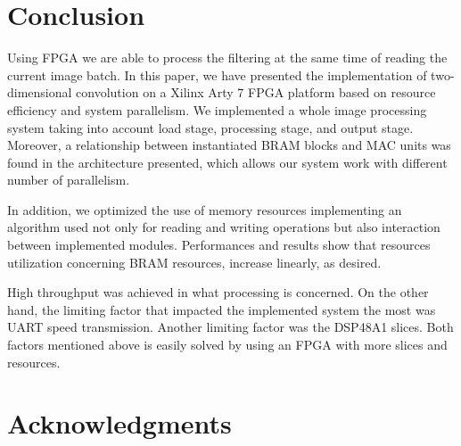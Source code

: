 \documentclass[conference,compsoc]{IEEEtran}
\begin{document}




\section{Conclusion}\label{sec:conclusion}
Using FPGA we are able to process the filtering at the same time of reading the
current image batch. In this paper, we have presented the implementation of
two-dimensional convolution on a Xilinx Arty 7 FPGA platform based on resource
efficiency and system parallelism. We implemented a whole image processing
system taking into account load stage, processing stage, and output stage.
Moreover, a relationship between instantiated BRAM blocks and MAC units was
found in the architecture presented, which allows our system work with different
number of parallelism.

In addition, we optimized the use of memory resources implementing an algorithm
used not only for reading and writing operations but also interaction between
implemented modules. Performances and results show that resources utilization
concerning BRAM resources, increase linearly, as desired.

High throughput was achieved in what processing is concerned. On the other hand,
the limiting factor that impacted the implemented system the most was UART speed
transmission. Another limiting factor was the DSP48A1 slices. Both factors
mentioned above is easily solved by using an FPGA with more slices and
resources.






\ifCLASSOPTIONcompsoc
  \section*{Acknowledgments}
\else
\end{document}
